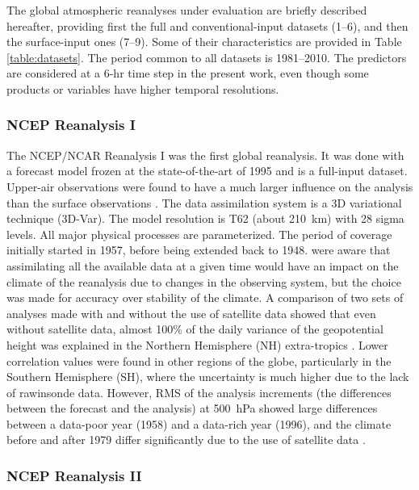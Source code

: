 \documentclass[smallextended]{svjour3}       %
\begin{document}
	The global atmospheric reanalyses under evaluation are briefly described hereafter, providing first the full and conventional-input datasets (1--6), and then the surface-input ones (7--9). Some of their characteristics are provided in Table \ref{table:datasets}. The period common to all datasets is 1981--2010. The predictors are considered at a 6-hr time step in the present work, even though some products or variables have higher temporal resolutions.
	
	
	\subsubsection{NCEP Reanalysis I}
	
	The NCEP/NCAR Reanalysis I \citep[NR-1 --][]{Kalnay1996, Kistler2001} was the first global reanalysis. It was done with a forecast model frozen at the state-of-the-art of 1995 and is a full-input dataset. Upper-air observations were found to have a much larger influence on the analysis than the surface observations \citep{Kistler2001}. The data assimilation system is a 3D variational technique (3D-Var). The model resolution is T62 (about 210~km) with 28 sigma levels. All major physical processes are parameterized. The period of coverage initially started in 1957, before being extended back to 1948. \citet{Kalnay1996} were aware that assimilating all the available data at a given time would have an impact on the climate of the reanalysis due to changes in the observing system, but the choice was made for accuracy over stability of the climate. A comparison of two sets of analyses made with and without the use of satellite data showed that even without satellite data, almost 100\% of the daily variance of the geopotential height was explained in the Northern Hemisphere (NH) extra-tropics \citep{Kalnay1996}. Lower correlation values were found in other regions of the globe, particularly in the Southern Hemisphere (SH), where the uncertainty is much higher due to the lack of rawinsonde data. However, RMS of the analysis increments (the differences between the forecast and the analysis) at 500~hPa showed large differences between a data-poor year (1958) and a data-rich year (1996), and the climate before and after 1979 differ significantly due to the use of satellite data \citep{Kistler2001}.
	
	
	\subsubsection{NCEP Reanalysis II}
	
\end{document}
